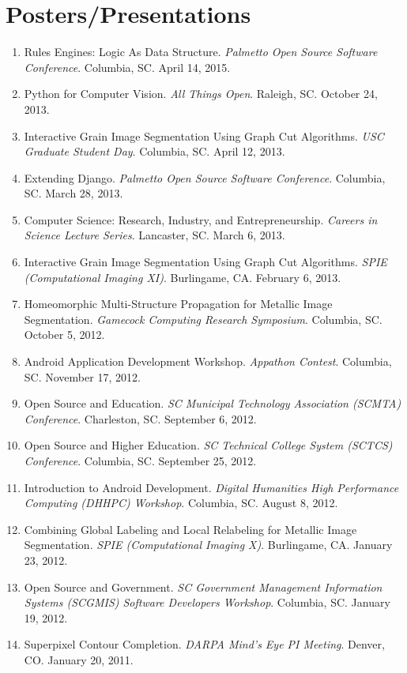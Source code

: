 \documentclass[10pt]{article}
\begin{document}
\section{Posters/Presentations}
\begin{enumerate}
\renewcommand{\labelenumi}{[P\arabic{enumi}] }
\item Rules Engines: Logic As Data Structure. \emph{Palmetto Open Source Software Conference}. Columbia, SC. April 14, 2015.
\item Python for Computer Vision. \emph{All Things Open}. Raleigh, SC. October 24, 2013.
\item Interactive Grain Image Segmentation Using Graph Cut Algorithms. \emph{USC Graduate Student Day}. Columbia, SC. April 12, 2013.
\item Extending Django.  \emph{Palmetto Open Source Software
    Conference}.  Columbia, SC.  March 28, 2013.
\item Computer Science: Research, Industry, and Entrepreneurship.
  \emph{Careers in Science Lecture Series}.  Lancaster, SC.  March 6,
  2013.
\item Interactive Grain Image Segmentation Using Graph Cut Algorithms.
  \emph{SPIE (Computational Imaging XI)}.  Burlingame, CA.  February
  6, 2013.
\item Homeomorphic Multi-Structure Propagation for Metallic Image
  Segmentation.  \emph{Gamecock Computing Research Symposium}.
  Columbia, SC.  October 5, 2012.
\item Android Application Development Workshop.  \emph{Appathon
    Contest}.  Columbia, SC.  November 17, 2012.
\item Open Source and Education. \emph{SC Municipal Technology
    Association (SCMTA) Conference}. Charleston, SC.  September 6,
  2012.
\item Open Source and Higher Education.  \emph{SC Technical College
    System (SCTCS) Conference}.  Columbia, SC.  September 25, 2012.
\item Introduction to Android Development.  \emph{Digital Humanities
    High Performance Computing (DHHPC) Workshop}.  Columbia, SC.
  August 8, 2012.
\item Combining Global Labeling and Local Relabeling for Metallic
  Image Segmentation.  \emph{SPIE (Computational Imaging X)}.
  Burlingame, CA.  January 23, 2012.
\item Open Source and Government.  \emph{SC Government Management
    Information Systems (SCGMIS) Software Developers Workshop}.
  Columbia, SC.  January 19, 2012.
\item Superpixel Contour Completion.  \emph{DARPA Mind's Eye PI
    Meeting}.  Denver, CO.  January 20, 2011.
\end{enumerate}
\end{document}
